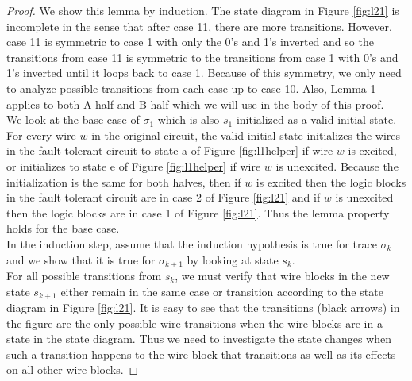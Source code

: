\documentclass[12pt]{report}
\begin{document}
\begin{proof}
We show this lemma by induction.  The state diagram in Figure \ref{fig:l21} is incomplete in the sense that after case 11, there are more transitions.  However, case 11 is symmetric to case 1 with only the 0's and 1's inverted and so the transitions from case 11 is symmetric to the transitions from case 1 with 0's and 1's inverted until it loops back to case 1.  Because of this symmetry, we only need to analyze possible transitions from each case up to case 10.  Also, Lemma 1 applies to both A half and B half which we will use in the body of this proof.\\

We look at the base case of $\sigma_1$ which is also $s_1$ initialized as a valid initial state.  For every wire $w$ in the original circuit, the valid initial state initializes the wires in the fault tolerant circuit to state a of Figure \ref{fig:l1helper} if wire $w$ is excited, or initializes to state e of Figure \ref{fig:l1helper} if wire $w$ is unexcited.  Because the initialization is the same for both halves, then if $w$ is excited then the logic blocks in the fault tolerant circuit are in case 2 of Figure \ref{fig:l21} and if $w$ is unexcited then the logic blocks are in case 1 of Figure \ref{fig:l21}.  Thus the lemma property holds for the base case. \\
In the induction step, assume that the induction hypothesis is true for trace $\sigma_k$ and we show that it is true for $\sigma_{k+1}$ by looking at state $s_k$.  \\

For all possible transitions from $s_k$, we must verify that wire blocks in the new state $s_{k+1}$ either remain in the same case or transition according to the state diagram in Figure \ref{fig:l21}.  It is easy to see that the transitions (black arrows) in the figure are the only possible wire transitions when the wire blocks are in a state in the state diagram.  Thus we need to investigate the state changes when such a transition happens to the wire block that transitions as well as its effects on all other wire blocks. 


\end{proof}
\end{document}
